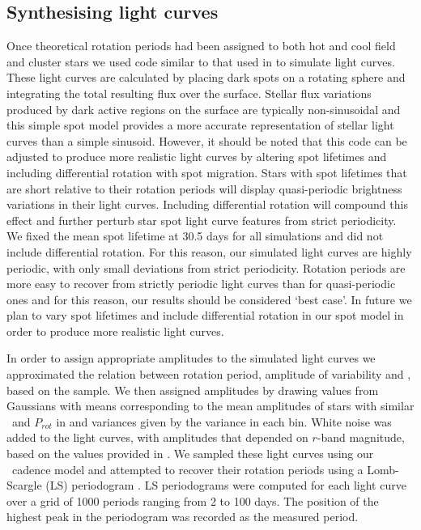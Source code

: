 \subsection{Synthesising light curves}
Once theoretical rotation periods had been assigned to both hot and cool field
and cluster stars we used code similar to that used in \citet{Aigrain2015b} to
simulate light curves.
These light curves are calculated by placing dark spots on a rotating sphere
and integrating the total resulting flux over the surface.
Stellar flux variations produced by dark active regions on the surface are
typically non-sinusoidal and this simple spot model provides a more accurate
representation of stellar light curves than a simple sinusoid.
However, it should be noted that this code can be adjusted to produce more
realistic light curves by altering spot lifetimes and including differential
rotation with spot migration.
Stars with spot lifetimes that are short relative to their rotation periods
will display quasi-periodic brightness variations in their light curves.
Including differential rotation will compound this effect and further perturb
star spot light curve features from strict periodicity.
We fixed the mean spot lifetime at 30.5 days for all simulations and did not
include differential rotation.
For this reason, our simulated light curves are highly periodic, with only
small deviations from strict periodicity.
Rotation periods are more easy to recover from strictly periodic light curves
than for quasi-periodic ones and for this reason, our results should be
considered `best case'.
In future we plan to vary spot lifetimes and include differential rotation in
our spot model in order to produce more realistic light curves.

In order to assign appropriate amplitudes to the simulated light curves we
approximated the relation between rotation period, amplitude of variability
and \teff, based on the \citet{Mcquillan2014} sample.
We then assigned amplitudes by drawing values from Gaussians with means
corresponding to the mean amplitudes of stars with similar \teff\ and
$P_{rot}$ in \citet{Mcquillan2014} and variances given by the variance in each
bin.
White noise was added to the light curves, with amplitudes that depended on
$r$-band magnitude, based on the values provided in \citet{Jacklin2015}.
We sampled these light curves using our \LSST\ cadence model and attempted to
recover their rotation periods using a Lomb-Scargle (LS) periodogram
\citep[][]{Lomb1976, Scargle1982}.
LS periodograms were computed for each light curve over a grid of 1000 periods
ranging from 2 to 100 days.
The position of the highest peak in the periodogram was recorded as the
measured period.

